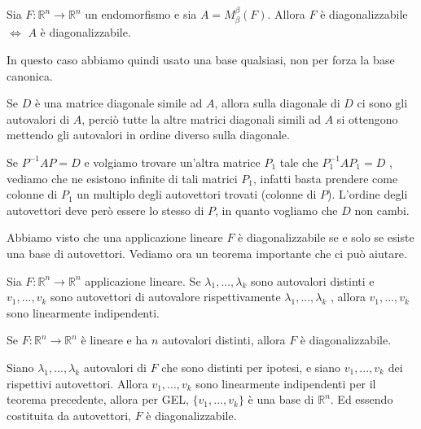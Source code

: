 \documentclass[
  a4paper,
]{article}
\begin{document}
\begin{propositionbox}
Sia \(F: \mathbb{R}^n \to \mathbb{R}^n\) un endomorfismo e sia
\(A = M^{{\beta}}_{\beta}(F)\). Allora \(F\) è diagonalizzabile \(\iff\)
\(A\) è diagonalizzabile.

In questo caso abbiamo quindi usato una base qualsiasi, non per forza la
base canonica.
\end{propositionbox}

\begin{observationbox}
Se \(D\) è una matrice diagonale simile ad \(A\), allora sulla diagonale
di \(D\) ci sono gli autovalori di \(A\), perciò tutte la altre matrici
diagonali simili ad \(A\) si ottengono mettendo gli autovalori in ordine
diverso sulla diagonale.
\end{observationbox}

\begin{observationbox}
Se \(P^{-1}AP = D\) e volgiamo trovare un'altra matrice \(P_1\) tale che
\(P_1^{-1}AP_1 = D\) , vediamo che ne esistono infinite di tali matrici
\(P_1\), infatti basta prendere come colonne di \(P_1\) un multiplo
degli autovettori trovati (colonne di \(P\)). L'ordine degli autovettori
deve però essere lo stesso di \(P\), in quanto vogliamo che \(D\) non
cambi.
\end{observationbox}

Abbiamo visto che una applicazione lineare \(F\) è diagonalizzabile se e
solo se esiste una base di autovettori. Vediamo ora un teorema
importante che ci può aiutare.

\begin{teoremabox}
Sia \(F: \mathbb{R}^n \to \mathbb{R}^n\) applicazione lineare. Se
\(\lambda_1, ..., \lambda_k\) sono autovalori distinti e
\(v_1, ..., v_k\) sono autovettori di autovalore rispettivamente
\(\lambda_1, ..., \lambda_k\) , allora \(v_1, ..., v_k\) sono
linearmente indipendenti.
\end{teoremabox}

\begin{propositionbox}[corollario]
Se \(F: \mathbb{R}^n \to \mathbb{R}^n\) è lineare e ha \(n\) autovalori
distinti, allora \(F\) è diagonalizzabile.
\end{propositionbox}

\begin{proofbox}
Siano \(\lambda_1, ..., \lambda_k\) autovalori di \(F\) che sono
distinti per ipotesi, e siano \(v_1, ..., v_k\) dei rispettivi
autovettori. Allora \(v_1, ..., v_k\) sono linearmente indipendenti per
il teorema precedente, allora per GEL, \(\{v_1, ..., v_k\}\) è una base
di \(\mathbb{R}^n\). Ed essendo costituita da autovettori, \(F\) è
diagonalizzabile.
\end{proofbox}
\end{document}
